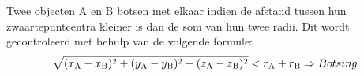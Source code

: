 Twee objecten A en B botsen met elkaar indien de afstand tussen hun zwaartepuntcentra kleiner is dan de som van hun twee radii. Dit wordt gecontroleerd met behulp van de volgende formule:
\begin{equation*}
\sqrt{(x\textsubscript{A}-x\textsubscript{B})\textsuperscript{2} + (y\textsubscript{A} - y\textsubscript{B})\textsuperscript{2} + (z\textsubscript{A} - z\textsubscript{B})\textsuperscript{2}}  < r\textsubscript{A} + r\textsubscript{B} \Rightarrow Botsing
\end{equation*}

